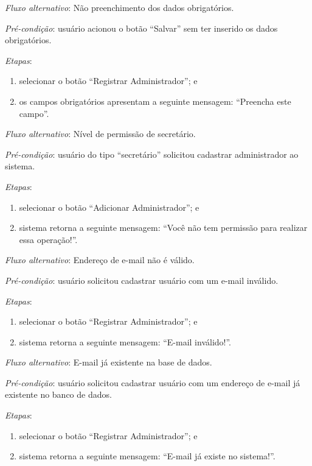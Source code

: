 \noindent \textit{Fluxo alternativo}: Não preenchimento dos dados obrigatórios.

\noindent \textit{Pré-condição}: usuário acionou o botão ``Salvar'' sem ter inserido os dados obrigatórios.

\noindent \textit{Etapas}:

\begin{enumerate}
    \item selecionar o botão ``Registrar Administrador''; e
    \item os campos obrigatórios apresentam a seguinte mensagem: ``Preencha este campo''.
\end{enumerate}


\noindent \textit{Fluxo alternativo}: Nível de permissão de secretário.

\noindent \textit{Pré-condição}: usuário do tipo ``secretário'' solicitou cadastrar administrador ao sistema.

\noindent \textit{Etapas}:

\begin{enumerate}
    \item selecionar o botão ``Adicionar Administrador''; e
    \item sistema retorna a seguinte mensagem: ``Você não tem permissão para realizar essa operação!''.
\end{enumerate}


\noindent \textit{Fluxo alternativo}: Endereço de e-mail não é válido.

\noindent \textit{Pré-condição}: usuário solicitou cadastrar usuário com um e-mail inválido.

\noindent \textit{Etapas}:

\begin{enumerate}
    \item selecionar o botão ``Registrar Administrador''; e
    \item sistema retorna a seguinte mensagem: ``E-mail inválido!''.
\end{enumerate}


\noindent \textit{Fluxo alternativo}: E-mail já existente na base de dados.

\noindent \textit{Pré-condição}: usuário solicitou cadastrar usuário com um endereço de e-mail já existente no banco de dados.

\noindent \textit{Etapas}:

\begin{enumerate}
    \item selecionar o botão ``Registrar Administrador''; e
    \item sistema retorna a seguinte mensagem: ``E-mail já existe no sistema!''.
\end{enumerate}


